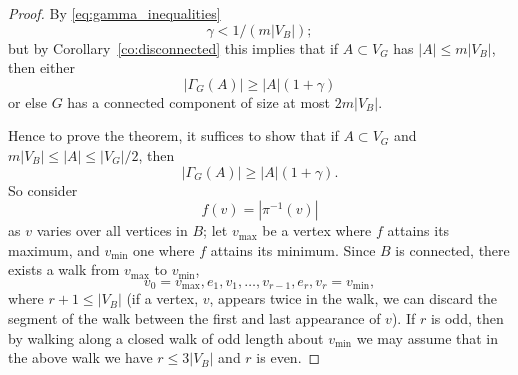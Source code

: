 \documentclass{memo-l}
\theoremstyle{plain}
\theoremstyle{definition}
\numberwithin{section}{chapter}
\numberwithin{equation}{chapter}
\theoremstyle{plain}
\theoremstyle{definition}
\begin{document}
\begin{proof}
By \eqref{eq:gamma_inequalities}
$$
\gamma < 1/(m|V_B|);
$$
but by Corollary~\ref{co:disconnected} this implies that
if $A\subset V_G$ has $|A|\le m|V_B|$, then either
$$
|\Gamma_G(A)|\ge |A|(1+\gamma)
$$
or else $G$ has a connected component of size at most $2m|V_B|$.

Hence to prove the theorem, it suffices to show that if
$A\subset V_G$ and $m|V_B|\le |A|\le |V_G|/2$, then
$$
|\Gamma_G(A)|\ge |A|(1+\gamma) .
$$
So consider 
$$
f(v)=|\pi^{-1}(v)|
$$
as $v$ varies over all vertices in $B$;
let $v_{\max}$ be a vertex where $f$ attains its maximum, and
$v_{\min}$ one where $f$ attains its minimum.  Since $B$ is 
connected, there exists a walk from $v_{\max}$ to $v_{\min}$,
$$
v_0=v_{\max},e_1,v_1,\ldots, v_{r-1},e_r,v_r=v_{\min},
$$
where $r+1\le |V_B|$ (if a vertex, $v$, appears twice in the walk, we can
discard the segment of the walk between the first and last
appearance of $v$).
If $r$ is odd, then by walking along a closed walk of odd length
about $v_{\min}$ we may assume
that in the above walk we have $r \le 3|V_B|$ and $r$ is even.


\end{proof}
\end{document}
